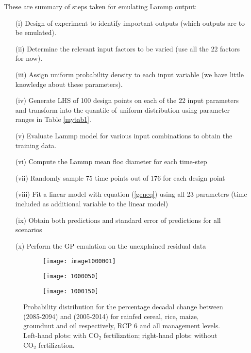 \documentclass[12pt,titlepage]{report}
\theoremstyle{definition}
\theoremstyle{remark}
\begin{document}
These are summary of steps taken for emulating Lammp output:
\begin{itemize}
\item[{(i)}] Design of experiment to identify important outputs (which outputs are to be emulated). 
\item[{(ii)}] Determine the relevant input factors to be varied (use all the 22 factors for now). 
\item[{(iii)}] Assign uniform probability density to each input variable (we have little knowledge about these parameters). 
\item[{(iv)}] Generate LHS of 100 design points on each of the 22 input parameters and transform into the quantile of uniform distribution using parameter ranges in Table \ref{mytab1}. 
\item[{(v)}] Evaluate Lammp model for various input combinations to obtain the training data.
\item[{(vi)}] Compute the Lammp mean floc diameter for each time-step
\item[{(vii)}] Randomly sample 75 time points out of 176 for each design point
\item[{(viii)}] Fit a linear model with equation (\ref{geneq}) using all 23 parameters (time included as additional variable to the linear model)
\item[{(ix)}] Obtain both predictions and standard error of predictions for all scenarios
\item[{(x)}] Perform the GP emulation on the unexplained residual data
\end{itemize}

\begin{figure}
        \centering
        \begin{subfigure}[h]{\textwidth}
           \texttt{[image: image1000001]}
                \label{p11a}
        \end{subfigure}\vspace*{-2em}
\centering
        \begin{subfigure}[b]{\textwidth}
               \texttt{[image: 1000050]}
                        \label{p11b}
        \end{subfigure}\vspace*{-2em}
                \centering
        \begin{subfigure}[b]{\textwidth}
                \texttt{[image: 1000150]}
                \label{p11c}
        \end{subfigure}\vspace*{-2.5em}
\caption{Probability distribution for the percentage decadal change between (2085-2094) and (2005-2014) for rainfed cereal, rice, maize, groundnut and oil respectively, RCP 6 and all management levels. Left-hand plots: with CO$_2$ fertilization; right-hand plots: without CO$_2$ fertilization.}\label{p1a}
\end{figure}
\end{document}
